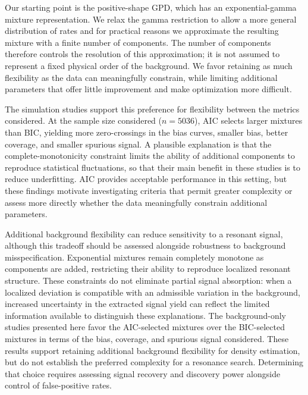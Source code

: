 \documentclass[a4paper,11pt]{article}
\begin{document}
Our starting point is the positive-shape GPD, which has an exponential-gamma mixture representation. We relax the gamma restriction to allow a more general distribution of rates and for practical reasons we approximate the resulting mixture with a finite number of components. The number of components therefore controls the resolution of this approximation; it is not assumed to represent a fixed physical order of the background. We favor retaining as much flexibility as the data can meaningfully constrain, while limiting additional parameters that offer little improvement and make optimization more difficult.

The simulation studies support this preference for flexibility between the metrics considered. At the sample size considered ($n=5036$), AIC selects larger mixtures than BIC, yielding more zero-crossings in the bias curves, smaller bias, better coverage, and smaller spurious signal. A plausible explanation is that the complete-monotonicity constraint limits the ability of additional components to reproduce statistical fluctuations, so that their main benefit in these studies is to reduce underfitting. AIC provides acceptable performance in this setting, but these findings motivate investigating criteria that permit greater complexity or assess more directly whether the data meaningfully constrain additional parameters.

Additional background flexibility can reduce sensitivity to a resonant signal, although this tradeoff should be assessed alongside robustness to background misspecification. Exponential mixtures remain completely monotone as components are added, restricting their ability to reproduce localized resonant structure. These constraints do not eliminate partial signal absorption: when a localized deviation is compatible with an admissible variation in the background, increased uncertainty in the extracted signal yield can reflect the limited information available to distinguish these explanations. The background-only studies presented here favor the AIC-selected mixtures over the BIC-selected mixtures in terms of the bias, coverage, and spurious signal considered. These results support retaining additional background flexibility for density estimation, but do not establish the preferred complexity for a resonance search. Determining that choice requires assessing signal recovery and discovery power alongside control of false-positive rates.
\end{document}
